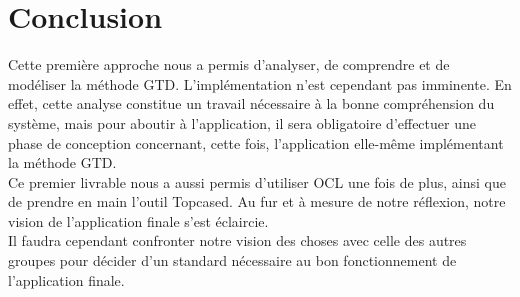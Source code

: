 \chapter{Conclusion}
Cette première approche nous a permis d'analyser, de comprendre et de modéliser la méthode GTD. 
L'implémentation n'est cependant pas imminente. En effet, cette analyse constitue un travail nécessaire à la bonne compréhension du système, mais pour aboutir à l'application, il sera obligatoire d'effectuer une phase de conception concernant, cette fois, l'application elle-même implémentant la méthode GTD.
\\
Ce premier livrable nous a aussi permis d'utiliser OCL une fois de plus, ainsi que de prendre en main l'outil Topcased.
Au fur et à mesure de notre réflexion, notre vision de l'application finale s'est éclaircie.
\\
Il faudra cependant confronter notre vision des choses avec celle des autres groupes pour décider d'un standard nécessaire au bon fonctionnement de l'application finale.
